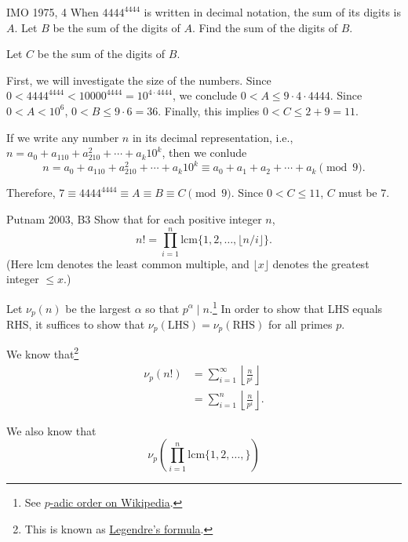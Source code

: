 
\begin{prob}{IMO 1975, 4}{}
	When \(4444^{4444}\) is written in decimal notation, the sum of its digits is \(A\).  Let \(B\) be the sum of the digits of \(A\). Find the sum of the digits of \(B\).
\end{prob}

\begin{sol}{}{}
	Let \(C\) be the sum of the digits of \(B\).

	First, we will investigate the size of the numbers.
	Since \(0 < 4444^{4444} < 10000^{4444} = 10^{4\cdot4444}\), we conclude \(0 < A \leq 9 \cdot 4 \cdot 4444\). Since \(0 < A < 10^6\), \(0 < B \leq 9 \cdot 6 = 36\). Finally, this implies \(0 < C \leq 2 + 9 = 11\).

	If we write any number \(n\) in its decimal representation, i.e., \(n = a_0 + a_110 + a_210^2 + \cdots + a_k10^k\), then we conlude \[
		n = a_0 + a_110 + a_210^2 + \cdots + a_k10^k \equiv a_0 + a_1 + a_2 + \cdots + a_k \pmod{9}.
	\]

	Therefore, \(7 \equiv 4444^{4444} \equiv A \equiv B \equiv C \pmod{9}\). Since \(0 < C \leq 11\), \(C\) must be \(7\).
\end{sol}

\begin{prob}{Putnam 2003, B3}{}
	Show that for each positive integer $n$, \[
		n! = \prod_{i=1}^n  \mathrm{lcm}\{1, 2, \dots, \lfloor n/i\rfloor\} .
	\] (Here $\mathrm{lcm}$ denotes the least common multiple, and
	$\lfloor x \rfloor$ denotes the greatest integer $\leq x$.)
\end{prob}

\begin{sol}{}{}
	Let \(\nu_p(n)\) be the largest \(\alpha\) so that \(p^\alpha \mid n\).\footnote{See \href{https://en.wikipedia.org/wiki/P-adic_order}{\(p\)-adic order on Wikipedia}.}
	In order to show that LHS equals RHS, it suffices to show that \(\nu_p(\mathrm{LHS}) = \nu_p(\mathrm{RHS})\) for all primes \(p\).

	We know that\footnote{This is known as \href{https://en.wikipedia.org/wiki/Legendre's_formula}{Legendre's formula}.}
	\begin{align*}
		\nu_p\left(n!\right) &= \sum_{i=1}^\infty \left\lfloor\frac{n}{p^i}\right\rfloor\\
		&= \sum_{i=1}^n \left\lfloor\frac{n}{p^i}\right\rfloor.
	\end{align*}

	We also know that \[
		\nu_p\left(\prod_{i=1}^n \mathrm{lcm}\{1, 2, \dots, \} \right)
	\]


\end{sol}

